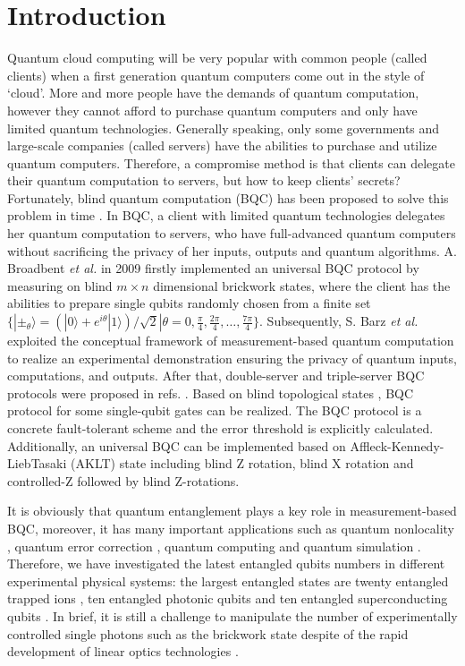 \documentclass[aps,pra,showpacs,twocolumn,superscriptaddress]{revtex4-1}
\begin{document}
\section{Introduction}
Quantum cloud computing will be very popular with common people (called clients) when a first generation quantum computers come out in the style of `cloud'. More and more people have the demands of quantum computation, however they cannot afford to purchase quantum computers and only have limited quantum technologies. Generally speaking, only some governments and large-scale companies (called servers) have the abilities to purchase and utilize quantum computers. Therefore, a compromise method is that clients can delegate their quantum computation to servers, but how to keep clients' secrets? Fortunately, blind quantum computation (BQC) has been proposed to solve this problem in time \cite{1Broadbent09,Barz12,2Morimae13,3Li14,4Sheng15,5Morimae2012,8Morimae2015,Fitz,Childs2005,22Fisher2014,Broa15}. In BQC, a client with limited quantum technologies delegates her quantum computation to servers, who have full-advanced quantum computers without sacrificing the privacy of her inputs, outputs and quantum algorithms. A. Broadbent \emph{et al.} \cite{1Broadbent09} in 2009 firstly implemented an universal BQC protocol by measuring on blind $m\times n$ dimensional brickwork states, where the client has the abilities to prepare single qubits randomly chosen from a finite set $\{|\pm_\theta\rangle=(|0\rangle+e^{i\theta}|1\rangle)/\sqrt{2}|\theta=0, \frac{\pi}{4}, \frac{2\pi}{4}, \ldots, \frac{7\pi}{4}\}$. Subsequently, S. Barz \emph{et al.} \cite{Barz12} exploited the conceptual framework of measurement-based quantum computation to realize an experimental demonstration ensuring the privacy of quantum inputs, computations, and outputs. After that, double-server and triple-server BQC protocols were proposed in refs. \cite{2Morimae13,3Li14,4Sheng15}. Based on blind topological states \cite{5Morimae2012}, BQC protocol for some single-qubit gates can be realized. The BQC protocol is a concrete fault-tolerant scheme and the error threshold is explicitly calculated. Additionally, an universal BQC can be implemented based on Affleck-Kennedy-LiebTasaki (AKLT) state \cite{8Morimae2015} including blind Z rotation, blind X rotation and controlled-Z followed by blind Z-rotations.

It is obviously that quantum entanglement \cite{Bandyopa11,Shor94,Rausse01,Seth96} plays a key role in measurement-based BQC, moreover, it has many important applications such as quantum nonlocality \cite{Bandyopa11}, quantum error correction \cite{Shor94}, quantum computing \cite{Rausse01} and quantum simulation \cite{Seth96}. Therefore, we have investigated the latest entangled qubits numbers in different experimental physical systems: the largest entangled states are twenty entangled trapped ions \cite{Friis18}, ten entangled photonic qubits \cite{Lin16} and ten entangled superconducting qubits \cite{Song17}. In brief, it is still a challenge to manipulate the number of experimentally controlled single photons such as the brickwork state despite of the rapid development of linear optics technologies \cite{Pan12}.
\end{document}
